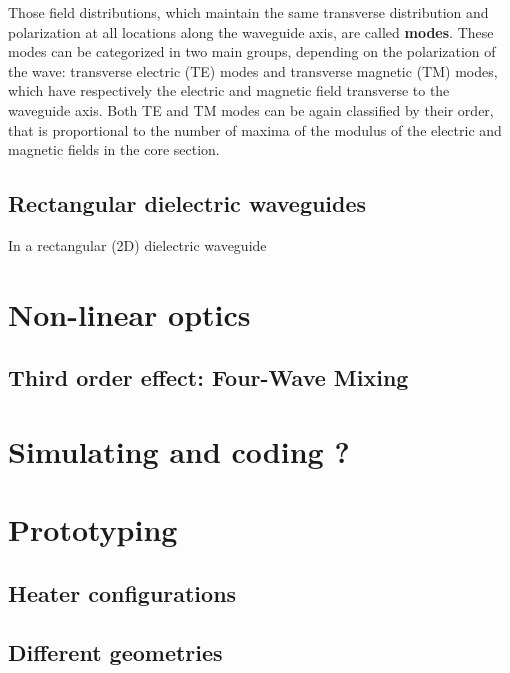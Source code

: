 \documentclass[12pt,a4paper]{article}
\begin{document}
Those field distributions, which maintain the same transverse distribution and polarization at all locations along the waveguide axis, are called \textbf{modes}.
These modes can be categorized in two main groups, depending on the polarization of the wave: transverse electric (TE) modes and transverse magnetic (TM) modes, which have respectively the electric and magnetic field transverse to the waveguide axis.
Both TE and TM modes can be again classified by their order, that is proportional to the number of maxima of the modulus of the electric and magnetic fields in the core section.

\subsection{Rectangular dielectric waveguides}
In a rectangular (2D) dielectric waveguide

\section{Non-linear optics}

\subsection{Third order effect: Four-Wave Mixing}

\section{Simulating and coding ?}

\section{Prototyping}
\subsection{Heater configurations}
\subsection{Different geometries}
\end{document}
